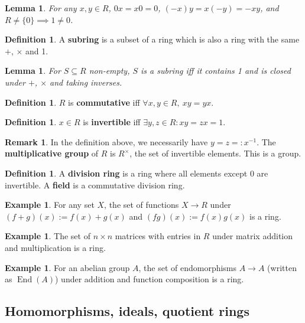 \documentclass[12pt]{article}
\newtheorem{lem}[thm]{Lemma}
\theoremstyle{definition}
\newtheorem{defn}[thm]{Definition}
\newtheorem{exm}[thm]{Example}
\newtheorem{rmk}[thm]{Remark}
\DeclareMathOperator{\End}{End}
\begin{document}
\begin{lem}
  For any $x, y \in R$, $0x = x0 = 0$, $(-x)y = x(-y) = -xy$, and $R \neq \{0\} \implies 1 \neq 0$.
\end{lem}

\begin{defn}
  A \textbf{subring} is a subset of a ring which is also a ring with the same $+$, $\times$ and 1.
\end{defn}

\begin{lem}
  For $S \subseteq R$ non-empty, $S$ is a subring iff it contains 1 and is closed under $+$, $\times$ and taking inverses.
\end{lem}

\begin{defn}
  $R$ is \textbf{commutative} iff $\forall x, y \in R,\ xy = yx$.
\end{defn}

\begin{defn}
  $x \in R$ is \textbf{invertible} iff $\exists y, z \in R : xy = zx = 1$.
\end{defn}

\begin{rmk}
  In the definition above, we necessarily have $y = z =: x^{-1}$.
  The \textbf{multiplicative group} of $R$ is $R^{\times}$, the set of invertible elements.
  This is a group.
\end{rmk}

\begin{defn}
  A \textbf{division ring} is a ring where all elements except 0 are invertible.
  A \textbf{field} is a commutative division ring.
\end{defn}

\begin{exm}
  For any set $X$, the set of functions $X \to R$ under $(f + g)(x) := f(x) + g(x)$ and $(fg)(x) := f(x)g(x)$ is a ring.
\end{exm}

\begin{exm}
  The set of $n \times n$ matrices with entries in $R$ under matrix addition and multiplication is a ring.
\end{exm}

\begin{exm}
  For an abelian group $A$, the set of endomorphisms $A \to A$ (written as $\End(A)$) under addition and function composition is a ring.
\end{exm}

\subsection{Homomorphisms, ideals, quotient rings}
\end{document}
